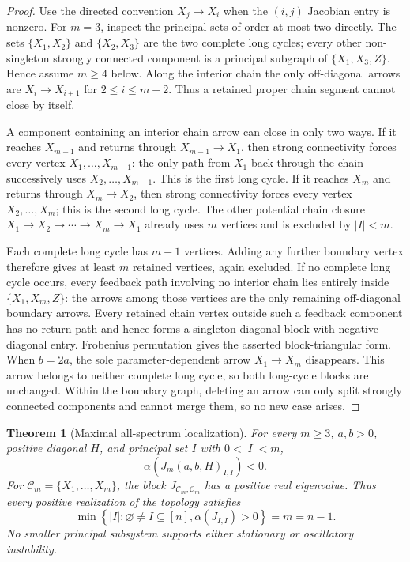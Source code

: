\documentclass[11pt]{article}
\newtheorem{theorem}{Theorem}[section]
\theoremstyle{definition}
\newcommand{\1}{\mathbf 1}
\newcommand{\cC}{\mathcal C}
\newcommand{\alphaS}{\alpha}
\begin{document}
\begin{proof}
Use the directed convention $X_j\to X_i$ when the $(i,j)$ Jacobian entry is
nonzero.  For $m=3$, inspect the principal sets of order at most two directly.
The sets $\{X_1,X_2\}$ and $\{X_2,X_3\}$ are the two complete long cycles;
every other non-singleton strongly connected component is a principal subgraph
of $\{X_1,X_3,Z\}$.  Hence assume $m\ge4$ below.  Along the interior chain the
only off-diagonal arrows are
$X_i\to X_{i+1}$ for $2\le i\le m-2$.  Thus a retained proper chain segment
cannot close by itself.

A component containing an interior chain arrow can close in only two ways.
If it reaches $X_{m-1}$ and returns through $X_{m-1}\to X_1$, then strong
connectivity forces every vertex $X_1,\ldots,X_{m-1}$: the only path from
$X_1$ back through the chain successively uses $X_2,\ldots,X_{m-1}$.  This is
the first long cycle.  If it reaches $X_m$ and returns through
$X_m\to X_2$, then strong connectivity forces every vertex
$X_2,\ldots,X_m$; this is the second long cycle.  The other potential chain
closure $X_1\to X_2\to\cdots\to X_m\to X_1$ already uses $m$ vertices and is
excluded by $|I|<m$.

Each complete long cycle has $m-1$ vertices.  Adding any further boundary
vertex therefore gives at least $m$ retained vertices, again excluded.  If no
complete long cycle occurs, every feedback path involving no interior chain
lies entirely inside $\{X_1,X_m,Z\}$: the arrows among those vertices are the
only remaining off-diagonal boundary arrows.  Every retained chain vertex
outside such a feedback component has no return path and hence forms a
singleton diagonal block with negative diagonal entry.  Frobenius
permutation gives the asserted block-triangular form.  When $b=2a$, the sole
parameter-dependent arrow $X_1\to X_m$ disappears.  This arrow belongs to
neither complete long cycle, so both long-cycle blocks are unchanged.  Within
the boundary graph, deleting an arrow can only split strongly connected
components and cannot merge them, so no new case arises.
\end{proof}

\begin{theorem}[Maximal all-spectrum localization]\label{thm:allspectrum}
For every $m\ge3$, $a,b>0$, positive diagonal $H$, and principal set $I$ with
$0<|I|<m$,
\begin{equation}\label{eq:lowerhurwitz}
 \alphaS(J_m(a,b,H)_{I,I})<0.
\end{equation}
For
$\cC_m=\{X_1,\ldots,X_m\}$, the block $J_{\cC_m,\cC_m}$ has a positive real
eigenvalue.  Thus every positive realization of the topology satisfies
\begin{equation}\label{eq:maxorder}
 \boxed{\min\left\{|I|:\varnothing\ne I\subseteq[n],
 \alphaS(J_{I,I})>0\right\}=m=n-1.}
\end{equation}
No smaller principal subsystem supports either stationary or oscillatory
instability.
\end{theorem}
\end{document}

